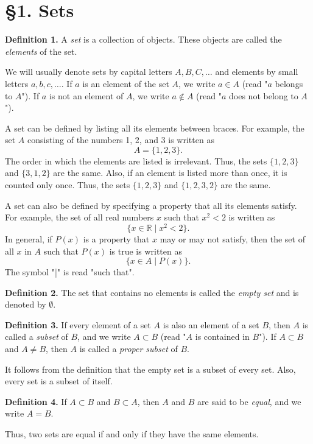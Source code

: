 \section*{§1. Sets}

\textbf{Definition 1.} A \textit{set} is a collection of objects. These objects are called the \textit{elements} of the set.

We will usually denote sets by capital letters $A, B, C, \dots$ and elements by small letters $a, b, c, \dots$. If $a$ is an element of the set $A$, we write $a \in A$ (read "$a$ belongs to $A$"). If $a$ is not an element of $A$, we write $a \notin A$ (read "$a$ does not belong to $A$").

A set can be defined by listing all its elements between braces. For example, the set $A$ consisting of the numbers 1, 2, and 3 is written as
\[
A = \{1, 2, 3\}.
\]
The order in which the elements are listed is irrelevant. Thus, the sets $\{1, 2, 3\}$ and $\{3, 1, 2\}$ are the same. Also, if an element is listed more than once, it is counted only once. Thus, the sets $\{1, 2, 3\}$ and $\{1, 2, 3, 2\}$ are the same.

A set can also be defined by specifying a property that all its elements satisfy. For example, the set of all real numbers $x$ such that $x^2 < 2$ is written as
\[
\{x \in \mathbb{R} \mid x^2 < 2\}.
\]
In general, if $P(x)$ is a property that $x$ may or may not satisfy, then the set of all $x$ in $A$ such that $P(x)$ is true is written as
\[
\{x \in A \mid P(x)\}.
\]
The symbol "|" is read "such that".

\textbf{Definition 2.} The set that contains no elements is called the \textit{empty set} and is denoted by $\emptyset$.

\textbf{Definition 3.} If every element of a set $A$ is also an element of a set $B$, then $A$ is called a \textit{subset} of $B$, and we write $A \subset B$ (read "$A$ is contained in $B$"). If $A \subset B$ and $A \neq B$, then $A$ is called a \textit{proper subset} of $B$.

It follows from the definition that the empty set is a subset of every set. Also, every set is a subset of itself.

\textbf{Definition 4.} If $A \subset B$ and $B \subset A$, then $A$ and $B$ are said to be \textit{equal}, and we write $A = B$.

Thus, two sets are equal if and only if they have the same elements.